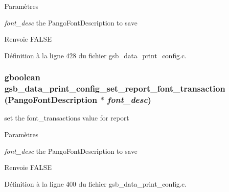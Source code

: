 \begin{DoxyParams}{Paramètres}
\item[{\em font\_\-desc}]the PangoFontDescription to save\end{DoxyParams}
\begin{DoxyReturn}{Renvoie}
FALSE 
\end{DoxyReturn}


Définition à la ligne 428 du fichier gsb\_\-data\_\-print\_\-config.c.

\subsubsection[{gsb\_\-data\_\-print\_\-config\_\-set\_\-report\_\-font\_\-transaction}]{\setlength{\rightskip}{0pt plus 5cm}gboolean gsb\_\-data\_\-print\_\-config\_\-set\_\-report\_\-font\_\-transaction (PangoFontDescription $\ast$ {\em font\_\-desc})}\label{gsb__data__print__config_8c_ad01d9f7bfcb5b81d37a5650b41ce17d9}
set the font\_\-transactions value for report


\begin{DoxyParams}{Paramètres}
\item[{\em font\_\-desc}]the PangoFontDescription to save\end{DoxyParams}
\begin{DoxyReturn}{Renvoie}
FALSE 
\end{DoxyReturn}


Définition à la ligne 400 du fichier gsb\_\-data\_\-print\_\-config.c.

